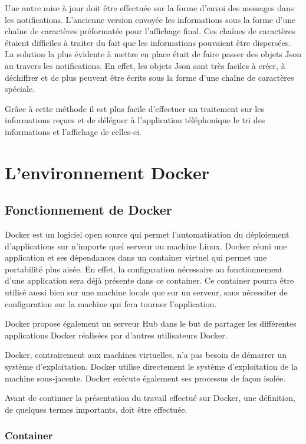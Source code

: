 Une autre mise à jour doit être effectuée sur la forme d'envoi des messages dans les notifications. L'ancienne version envoyée les informations sous la forme d'une chaîne de caractères préformatée pour l'affichage final. Ces chaînes de caractères étaient difficiles à traiter du fait que les informations pouvaient être dispersées. La solution la plus évidente à mettre en place était de faire passer des objets Json au travers les notifications. En effet, les objets Json sont très faciles à créer, à déchiffrer et de plus peuvent être écrits sous la forme d'une chaîne de caractères spéciale.

Grâce à cette méthode il est plus facile d'effectuer un traitement sur les informations reçues et de déléguer à l'application téléphonique le tri des informations et l'affichage de celles-ci.

\section{L'environnement Docker}

\subsection{Fonctionnement de Docker}

Docker est un logiciel open source qui permet l'automatisation du déploiement d'applications sur n'importe quel serveur ou machine Linux. Docker réuni une application et ses dépendances dans un container virtuel qui permet une portabilité plus aisée. En effet, la configuration nécessaire au fonctionnement d'une application sera déjà présente dans ce container. Ce container pourra être utilisé aussi bien sur une machine locale que sur un serveur, sans nécessiter de configuration sur la machine qui fera tourner l'application.

Docker propose également un serveur Hub dans le but de partager les différentes applications Docker réalisées par d'autres utilisateurs Docker.

Docker, contrairement aux machines virtuelles, n'a pas besoin de démarrer un système d'exploitation. Docker utilise directement le système d'exploitation de la machine sous-jacente. Docker exécute également ses processus de façon isolée.

Avant de continuer la présentation du travail effectué sur Docker, une définition, de quelques termes importants, doit être effectuée. 



\subsubsection{Container}

